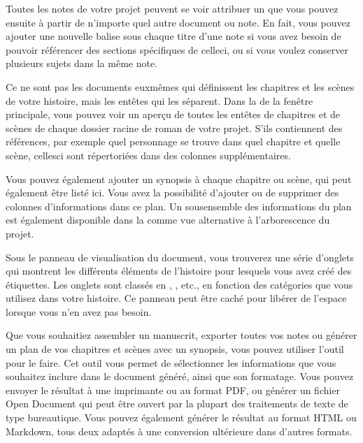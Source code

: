 \documentclass[a4paper,11pt,french]{sphinxmanual}
\begin{document}
\begin{description}
\sphinxAtStartPar
Toutes les notes de votre projet peuvent se voir attribuer un {\hyperref[\detokenize{int_glossary:term-Tag}]{}} que vous pouvez ensuite {\hyperref[\detokenize{int_glossary:term-Reference}]{}} à partir de n’importe quel autre document ou note. En fait, vous pouvez ajouter une nouvelle balise sous chaque titre d’une note si vous avez besoin de pouvoir référencer des sections spécifiques de celle\sphinxhyphen{}ci, ou si vous voulez conserver plusieurs sujets dans la même note.

\sphinxAtStartPar
Ce ne sont pas les documents eux\sphinxhyphen{}mêmes qui définissent les chapitres et les scènes de votre histoire, mais les en\sphinxhyphen{}têtes qui les séparent. Dans la  de la fenêtre principale, vous pouvez voir un aperçu de toutes les en\sphinxhyphen{}têtes de chapitres et de scènes de chaque dossier racine de roman de votre projet. S’ils contiennent des références, par exemple quel personnage se trouve dans quel chapitre et quelle scène, celles\sphinxhyphen{}ci sont répertoriées dans des colonnes supplémentaires.

\sphinxAtStartPar
Vous pouvez également ajouter un synopsis à chaque chapitre ou scène, qui peut également être listé ici. Vous avez la possibilité d’ajouter ou de supprimer des colonnes d’informations dans ce plan. Un sous\sphinxhyphen{}ensemble des informations du plan est également disponible dans la  comme vue alternative à l’arborescence du projet.

\sphinxAtStartPar
Sous le panneau de visualisation du document, vous trouverez une série d’onglets qui montrent les différents éléments de l’histoire pour lesquels vous avez créé des étiquettes. Les onglets sont classés en , , etc., en fonction des catégories que vous utilisez dans votre histoire. Ce panneau peut être caché pour libérer de l’espace lorsque vous n’en avez pas besoin.

\sphinxAtStartPar
Que vous souhaitiez assembler un manuscrit, exporter toutes vos notes ou générer un plan de vos chapitres et scènes avec un synopsis, vous pouvez utiliser l’outil  pour le faire. Cet outil vous permet de sélectionner les informations que vous souhaitez inclure dans le document généré, ainsi que son formatage. Vous pouvez envoyer le résultat à une imprimante ou au format PDF, ou générer un fichier Open Document qui peut être ouvert par la plupart des traitements de texte de type bureautique. Vous pouvez également générer le résultat au format HTML ou Markdown, tous deux adaptés à une conversion ultérieure dans d’autres formats.

\end{description}
\end{document}
